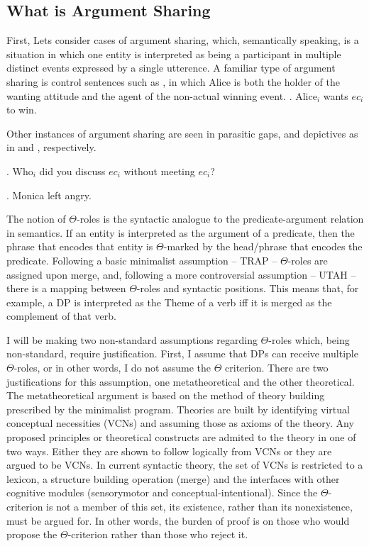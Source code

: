 \documentclass[letterpaper,12pt]{article}
\begin{document}
\subsection{What is Argument Sharing}
First, Lets consider cases of argument sharing, which, semantically speaking, is a situation in which one entity is interpreted as being a participant in multiple distinct events expressed by a single utterence.
A familiar type of argument sharing is control sentences such as \Next, in which Alice is both the holder of the wanting attitude and the agent of the non-actual winning event.
\ex.\label{ex:Control} Alice$_i$ wants $ec_i$ to win.

Other instances of argument sharing are seen in parasitic gaps, and depictives as in \Next and \NNext, respectively.

\ex. Who$_i$ did you discuss $ec_i$ without meeting $ec_i$?

\ex. Monica left angry.

The notion of $\Theta$-roles is the syntactic analogue to the predicate-argument relation in semantics.
If an entity is interpreted as the argument of a predicate, then the phrase that encodes that entity is $\Theta$-marked by the head/phrase that encodes the predicate.
Following a basic minimalist assumption -- TRAP \parencite{hornsteinetal2005understanding} -- $\Theta$-roles are assigned upon merge, and, following a more controversial assumption -- UTAH \parencite{baker1988incorporation}-- there is a mapping between $\Theta$-roles and syntactic positions.
This means that, for example, a DP is interpreted as the Theme of a verb iff it is merged as the complement of that verb.

I will be making two non-standard assumptions regarding $\Theta$-roles which, being non-standard, require justification.
First, I assume that DPs can receive multiple $\Theta$-roles, or in other words, I do not assume the $\Theta$ criterion.
There are two justifications for this assumption, one metatheoretical and the other theoretical.
The metatheoretical argument is based on the method of theory building prescribed by the minimalist program.
Theories are built by identifying virtual conceptual necessities (VCNs) and assuming those as axioms of the theory.
Any proposed principles or theoretical constructs are admited to the theory in one of two ways.
Either they are shown to follow logically from VCNs or they are argued to be VCNs.
In current syntactic theory, the set of VCNs is restricted to a lexicon, a structure building operation (merge) and the interfaces with other cognitive modules (sensorymotor and conceptual-intentional).
Since the $\Theta$-criterion is not a member of this set, its existence, rather than its nonexistence, must be argued for.
In other words, the burden of proof is on those who would propose the $\Theta$-criterion rather than those who reject it.
\end{document}
